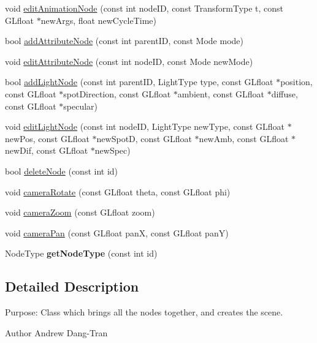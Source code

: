 \begin{DoxyCompactItemize}
void \hyperlink{classSceneGraph_a3926097010b35104826c42d3e880eaf1}{edit\-Animation\-Node} (const int node\-I\-D, const Transform\-Type t, const G\-Lfloat $\ast$new\-Args, float new\-Cycle\-Time)
\item 
bool \hyperlink{classSceneGraph_a08c22573bfb236c5d100d2e0852eb827}{add\-Attribute\-Node} (const int parent\-I\-D, const Mode mode)
\item 
void \hyperlink{classSceneGraph_a2b54cadc617d3cdc828005ece998e3d0}{edit\-Attribute\-Node} (const int node\-I\-D, const Mode new\-Mode)
\item 
bool \hyperlink{classSceneGraph_aa5ce83892a3786d9a6ff6a05994d1323}{add\-Light\-Node} (const int parent\-I\-D, Light\-Type type, const G\-Lfloat $\ast$position, const G\-Lfloat $\ast$spot\-Direction, const G\-Lfloat $\ast$ambient, const G\-Lfloat $\ast$diffuse, const G\-Lfloat $\ast$specular)
\item 
void \hyperlink{classSceneGraph_ae7eaaa12346ede54a8a6ce4c6bf5d89d}{edit\-Light\-Node} (const int node\-I\-D, Light\-Type new\-Type, const G\-Lfloat $\ast$new\-Pos, const G\-Lfloat $\ast$new\-Spot\-D, const G\-Lfloat $\ast$new\-Amb, const G\-Lfloat $\ast$new\-Dif, const G\-Lfloat $\ast$new\-Spec)
\item 
bool \hyperlink{classSceneGraph_a5d945279fb8acf87519ec0050486441c}{delete\-Node} (const int id)
\item 
void \hyperlink{classSceneGraph_addbd59946f266cd0f29bc47e68918a0a}{camera\-Rotate} (const G\-Lfloat theta, const G\-Lfloat phi)
\item 
void \hyperlink{classSceneGraph_a595a0a4fb507ce008bca05ccf284c5ab}{camera\-Zoom} (const G\-Lfloat zoom)
\item 
void \hyperlink{classSceneGraph_a8fad2a82153647e4a91a197f2445a7ca}{camera\-Pan} (const G\-Lfloat pan\-X, const G\-Lfloat pan\-Y)
\item 
\hypertarget{classSceneGraph_a3c26e0dda954dd444ade94c18bf831e8}{Node\-Type {\bfseries get\-Node\-Type} (const int id)}\label{classSceneGraph_a3c26e0dda954dd444ade94c18bf831e8}

\end{DoxyCompactItemize}


\subsection{Detailed Description}
Purpose\-: Class which brings all the nodes together, and creates the scene. \begin{DoxyAuthor}{Author}
Andrew Dang-\/\-Tran 
\end{DoxyAuthor}



